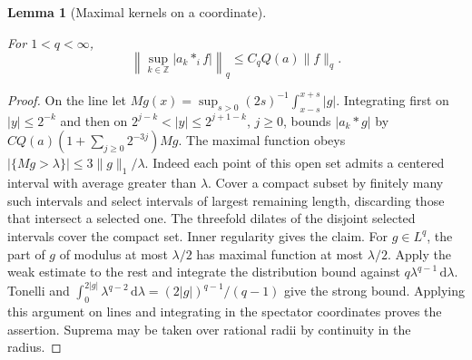 \documentclass[11pt,letterpaper]{article}
\newtheorem{lemma}[theorem]{Lemma}
\theoremstyle{definition}
\newcommand{\dd}{\,\mathrm d}
\providecommand{\lean}[1]{}
\begin{document}
\begin{lemma}[Maximal kernels on a coordinate]\label{bp:profile-max}
\lean{TwistedParaproduct.profileMax}
For \(1<q<\infty\),
\[
 \left\|\sup_{k\in\mathbb Z}|a_k*_i f|\right\|_q
 \le C_q Q(a)\|f\|_q .
\]
\end{lemma}
\begin{proof}
On the line let \(M g(x)=\sup_{s>0}(2s)^{-1}
\int_{x-s}^{x+s}|g|\). Integrating first on \(|y|\le 2^{-k}\)
and then on \(2^{j-k}<|y|\le 2^{j+1-k}\), \(j\ge0\), bounds
\(|a_k*g|\) by \(C Q(a)(1+\sum_{j\ge0}2^{-3j})Mg\).
The maximal function obeys
\(|\{Mg>\lambda\}|\le 3\|g\|_1/\lambda\).
Indeed each point of this open set admits a centered interval with
average greater than \(\lambda\). Cover a compact subset by finitely
many such intervals and select intervals of largest remaining length,
discarding those that intersect a selected one. The threefold dilates
of the disjoint selected intervals cover the compact set. Inner
regularity gives the claim. For \(g\in L^q\), the part of \(g\) of
modulus at most \(\lambda/2\) has maximal function at most \(\lambda/2\).
Apply the weak estimate to the rest and integrate the distribution
bound against \(q\lambda^{q-1}\dd\lambda\). Tonelli and
\(\int_0^{2|g|}\lambda^{q-2}\dd\lambda=(2|g|)^{q-1}/(q-1)\)
give the strong bound. Applying this argument on lines and integrating
in the spectator coordinates proves the assertion. Suprema may be
taken over rational radii by continuity in the radius.
\end{proof}
\end{document}
